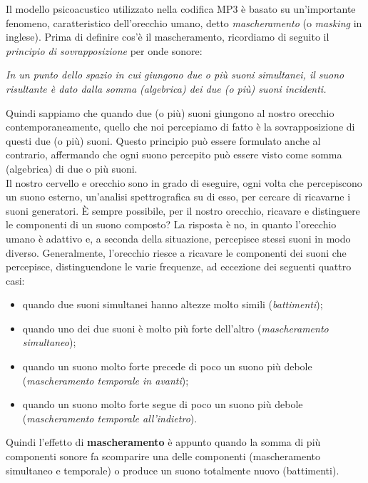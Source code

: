 		Il modello psicoacustico utilizzato nella codifica MP3 è basato su un'importante fenomeno, caratteristico dell'orecchio umano, detto \textit{mascheramento} (o \textit{masking} in inglese). Prima di definire cos'è il mascheramento, ricordiamo di seguito il \textit{principio di sovrapposizione} per onde sonore:
		\begin{center}
			\textit{In un punto dello spazio in cui giungono due o più suoni simultanei, il suono risultante è dato dalla somma (algebrica) dei due (o più) suoni incidenti.}
		\end{center}
		Quindi sappiamo che quando due (o più) suoni giungono al nostro orecchio contemporaneamente, quello che noi percepiamo di fatto è la sovrapposizione di questi due (o più) suoni. Questo principio può essere formulato anche al contrario, affermando che ogni suono percepito può essere visto come somma (algebrica) di due o più suoni.\\
		Il nostro cervello e orecchio sono in grado di eseguire, ogni volta che percepiscono un suono esterno, un'analisi spettrografica su di esso, per cercare di ricavarne i suoni generatori. È sempre possibile, per il nostro orecchio, ricavare e distinguere le componenti di un suono composto? La risposta è no, in quanto l'orecchio umano è adattivo e, a seconda della situazione, percepisce stessi suoni in modo diverso. Generalmente, l'orecchio riesce a ricavare le componenti dei suoni che percepisce, distinguendone le varie frequenze, ad eccezione dei seguenti quattro casi:
		\begin{itemize}
			\item quando due suoni simultanei hanno altezze molto simili (\textit{battimenti});
			\item quando uno dei due suoni è molto più forte dell'altro (\textit{mascheramento simultaneo});
			\item quando un suono molto forte precede di poco un suono più debole (\textit{mascheramento temporale in avanti});
			\item quando un suono molto forte segue di poco un suono più debole (\textit{mascheramento temporale all'indietro}).
		\end{itemize}
		Quindi l'effetto di \textbf{mascheramento} è appunto quando la somma di più componenti sonore fa scomparire una delle componenti (mascheramento simultaneo e temporale) o produce un suono totalmente nuovo (battimenti).\\
		\\
